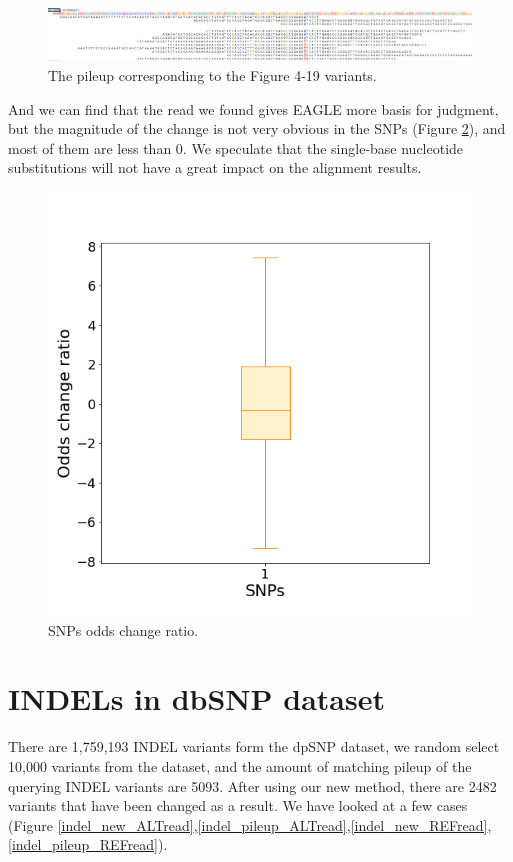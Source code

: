 \begin{figure}[H]
\centering
\includegraphics[width=1\columnwidth]{body/image/snp_pileup_REFread.png}
\caption[SNP worse match reads pileup]{The pileup corresponding to the Figure 4-19 variants.}
\label{snp_pileup_REFread}
\end{figure}

And we can find that the read we found gives EAGLE more basis for judgment, but the magnitude of the change is not very obvious in the SNPs (Figure \ref{snp_odds_change}), and most of them are less than 0. We speculate that the single-base nucleotide substitutions will not have a great impact on the alignment results.

\begin{figure}[H]
\centering
\includegraphics[width=0.6\columnwidth]{body/image/snp_odds_change.png}
\caption[SNPs odds change ratio]{SNPs odds change ratio.}
\label{snp_odds_change}
\end{figure}

\section{INDELs in dbSNP dataset}

There are 1,759,193 INDEL variants form the dpSNP dataset, we random select 10,000 variants from the dataset, and the amount of matching pileup of the querying INDEL variants are 5093. After using our new method, there are 2482 variants that have been changed as a result.  We have looked at a few cases  (Figure \ref{indel_new_ALTread},\ref{indel_pileup_ALTread},\ref{indel_new_REFread},\ref{indel_pileup_REFread}).

